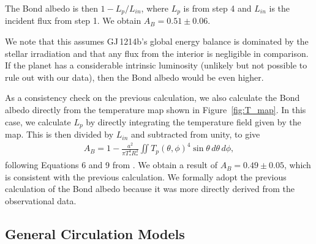 \documentclass[pdflatex,sn-standardnature]{sn-jnl}%
\begin{document}
The Bond albedo is then $1 - L_p/L_{in}$, where $L_p$ is from step 4 and $L_{in}$ is the incident flux from step 1.  We obtain $A_B = 0.51 \pm 0.06$.

We note that this assumes GJ\,1214b's global energy balance is dominated by the stellar irradiation and that any flux from the interior is negligible in comparison.  If the planet has a considerable intrinsic luminosity (unlikely but not possible to rule out with our data), then the Bond albedo would be even higher.


As a consistency check on the previous calculation, we also calculate the Bond albedo directly from the temperature map shown in Figure~\ref{fig:T_map}.  In this case, we calculate $L_{p}$ by directly integrating the temperature field given by the map.  This is then divided by $L_{in}$ and subtracted from unity, to give
\begin{align}
    A_B = 1 -  \frac{a^2}{\pi T_{*}^4 R_{*}^2} \iint T_{p}(\theta, \phi)^4 \sin \theta \,d \theta \,d \phi,
\end{align}
following Equations 6 and 9 from \cite{keating19}. We obtain a result of \mbox{$A_B = 0.49 \pm 0.05$}, which is consistent with the previous calculation.  We formally adopt the previous calculation of the Bond albedo because it was more directly derived from the observational data.


\subsection*{General Circulation Models}
\end{document}
